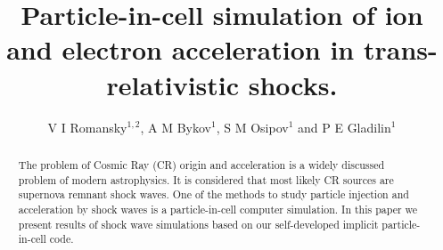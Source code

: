 \documentclass[a4paper]{jpconf}
\begin{document}
\title{Particle-in-cell simulation of ion and electron acceleration in trans-relativistic shocks.}

\author{V I Romansky$^{1,2}$, A M Bykov$^1$, S M Osipov$^1$ and P E Gladilin$^1$}

\address{$^1$ Ioffe Institute, 26 Politekhnicheskaya st., St. Petersburg 194021, Russia}
\address{$^2$ 
Sternberg Astronomical Institute, Moscow State University
 Universitetsky pr., 13, Moscow 119234, Russia}


\begin{abstract}
The problem of Cosmic Ray (CR) origin and acceleration is a widely discussed problem of
modern astrophysics. It is considered that most likely CR sources are supernova remnant
shock waves. One of the methods to study particle injection and acceleration by shock
waves is a particle-in-cell computer simulation. In this paper we present results of shock
wave simulations based on our self-developed implicit particle-in-cell code. 
\end{abstract}






\end{document}
